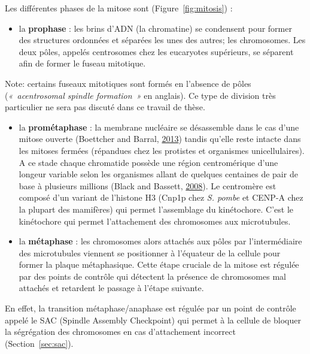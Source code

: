 \documentclass[12pt,a4paper,twoside,openright]{book}
\providecommand{\tightlist}{%
  \setlength{\itemsep}{0pt}\setlength{\parskip}{0pt}}
\begin{document}
Les différentes phases de la mitose sont (Figure~\ref{fig:mitosis}) :

\begin{itemize}
\tightlist
\item
  la \textbf{prophase} : les brins d'ADN (la chromatine) se condensent
  pour former des structures ordonnées et séparées les unes des autres;
  les chromosomes. Les deux pôles, appelés centrosomes chez les
  eucaryotes supérieurs, se séparent afin de former le fuseau mitotique.
\end{itemize}

Note: certains fuseaux mitotiques sont formés en l'absence de pôles
(\emph{«~acentrosomal spindle formation~»} en anglais). Ce type de
division très particulier ne sera pas discuté dans ce travail de thèse.

\begin{itemize}
\item
  la \textbf{prométaphase} : la membrane nucléaire se désassemble dans
  le cas d'une mitose ouverte (Boettcher and Barral,
  \protect\hyperlink{ref-Boettcher2013}{2013}) tandis qu'elle reste
  intacte dans les mitoses fermées (répandues chez les protistes et
  organismes unicellulaires). A ce stade chaque chromatide possède une
  région centromérique d'une longeur variable selon les organismes
  allant de quelques centaines de pair de base à plusieurs millions
  (Black and Bassett, \protect\hyperlink{ref-Black2008}{2008}). Le
  centromère est composé d'un variant de l'histone H3 (Cnp1p chez
  \emph{S. pombe} et CENP-A chez la plupart des mamifères) qui permet
  l'assemblage du kinétochore. C'est le kinétochore qui permet
  l'attachement des chromosomes aux microtubules.
\item
  la \textbf{métaphase} : les chromosomes alors attachés aux pôles par
  l'intermédiaire des microtubules viennent se positionner à l'équateur
  de la cellule pour former la plaque métaphasique. Cette étape cruciale
  de la mitose est régulée par des points de contrôle qui détectent la
  présence de chromosomes mal attachés et retardent le passage à l'étape
  suivante.
\end{itemize}

En effet, la transition métaphase/anaphase est régulée par un point de
contrôle appelé le SAC (Spindle Assembly Checkpoint) qui permet à la
cellule de bloquer la ségrégation des chromosomes en cas d'attachement
incorrect (Section~\ref{sec:sac}).
\end{document}

